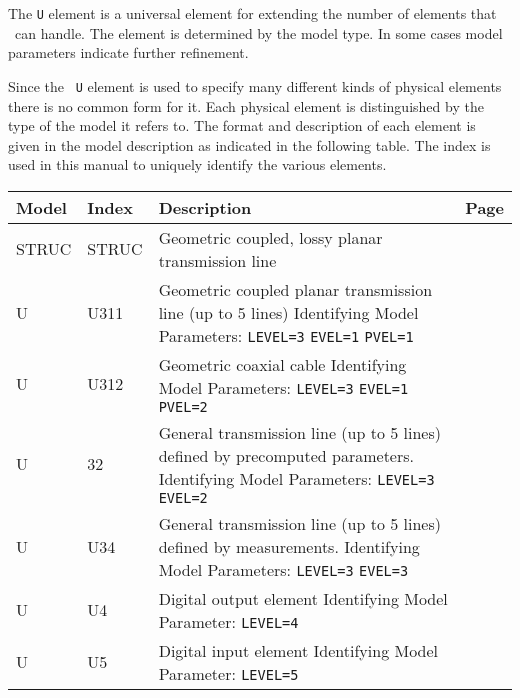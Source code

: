
The {\tt U} element is a universal element for extending the number of
elements that \justspice\ can
handle. The element is determined by the model type. In some cases
model parameters indicate further refinement.

Since the \justspice\ {\tt U} element is used to specify many different
kinds of physical elements there is no common form for it.  Each physical
element is distinguished by the type of the model it refers to.  The format
and description of each element is given in the model description as
indicated in the following table.
The index is used in this manual to uniquely identify the various elements.


\modeltype{}
\noindent
\begin{tabular}{|p{0.6in}|p{0.6in}|p{4in}|r|}
\hline
Model & Index & Description                        & Page \\
\hline \hline STRUC&STRUC&Geometric coupled, lossy planar
transmission line
     & \pageref{STRUCmodel} \\
\hline
U&U311    &Geometric coupled planar transmission line (up to 5 lines)
      \newline Identifying Model Parameters:
      {\tt LEVEL=3} {\tt EVEL=1} {\tt PVEL=1}
     & \pageref{U3.1.1model} \\
\hline
U&U312    &Geometric coaxial cable
      \newline Identifying Model Parameters:
      {\tt LEVEL=3} {\tt EVEL=1} {\tt PVEL=2}
     & \pageref{U3.1.2model} \\
\hline
U&32    &General transmission line (up to 5 lines) defined by precomputed
      parameters.
      \newline Identifying Model Parameters:
      {\tt LEVEL=3} {\tt EVEL=2}
     & \pageref{U3.2model} \\
\hline
U&U34    &General transmission line (up to 5 lines) defined by measurements.
      \newline Identifying Model Parameters:
      {\tt LEVEL=3} {\tt EVEL=3}
     & \pageref{U3.3model} \\
\hline
U&U4    &Digital output element
      \newline Identifying Model Parameter: {\tt LEVEL=4}
     & \pageref{U4model} \\
\hline
U&U5    &Digital input element
      \newline Identifying Model Parameter: {\tt LEVEL=5}
     & \pageref{U5model} \\
\hline
\end{tabular}\\[0.1in]


